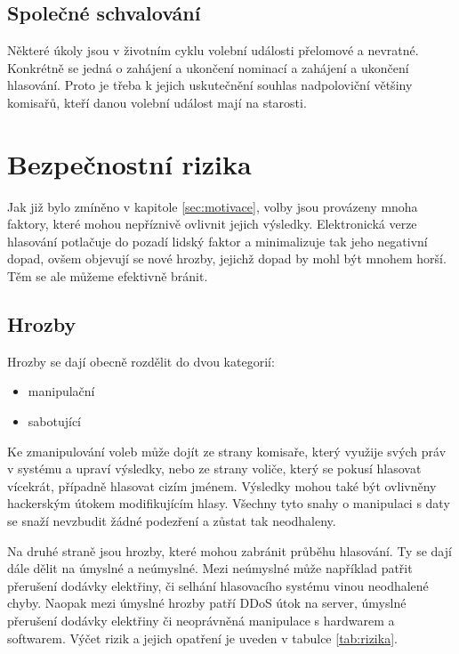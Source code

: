\documentclass[11pt,twoside,a4paper]{book}
\begin{document}
\subsection{Společné schvalování}

Některé úkoly jsou v životním cyklu volební události přelomové a nevratné. Konkrétně se jedná o zahájení a ukončení nominací a zahájení a ukončení hlasování. Proto je třeba k jejich uskutečnění souhlas nadpoloviční většiny komisařů, kteří danou volební událost mají na starosti.

\section{Bezpečnostní rizika} \label{sec:bezpecnostni_rizika}

Jak již bylo zmíněno v kapitole \ref{sec:motivace}, volby jsou provázeny mnoha faktory, které mohou nepříznivě ovlivnit jejich výsledky. Elektronická verze hlasování potlačuje do pozadí lidský faktor a minimalizuje tak jeho negativní dopad, ovšem objevují se nové hrozby, jejichž dopad by mohl být mnohem horší. Těm se ale můžeme efektivně bránit.

\subsection{Hrozby}

Hrozby\cite{book:prosser} se dají obecně rozdělit do dvou kategorií: 

\begin{itemize}
	\item manipulační
	\item sabotující
\end{itemize}	

Ke zmanipulování voleb může dojít ze strany komisaře, který využije svých práv v systému a upraví výsledky, nebo ze strany voliče, který se pokusí hlasovat vícekrát, případně hlasovat cizím jménem. Výsledky mohou také být ovlivněny hackerským útokem modifikujícím hlasy. Všechny tyto snahy o manipulaci s daty se snaží nevzbudit žádné podezření a zůstat tak neodhaleny. 

Na druhé straně jsou hrozby, které mohou zabránit průběhu hlasování. Ty se dají dále dělit na úmyslné a neúmyslné. Mezi neúmyslné může například patřit přerušení dodávky elektřiny, či selhání hlasovacího systému vinou neodhalené chyby. Naopak mezi úmyslné hrozby patří DDoS útok \cite{www:ddos} na server, úmyslné přerušení dodávky elektřiny či neoprávněná manipulace s hardwarem a softwarem. Výčet rizik a jejich opatření je uveden v tabulce \ref{tab:rizika}.
\end{document}
